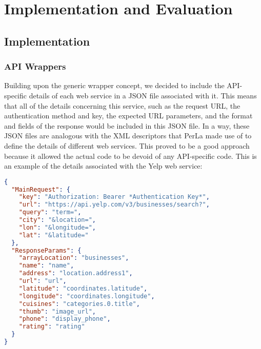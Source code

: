 \chapter{Implementation and Evaluation}
\label{capitolo7}
\thispagestyle{empty}
\section{Implementation}
\subsection{API Wrappers}
Building upon the generic wrapper concept, we decided to include the API-specific details of each web service in a JSON file associated with it. This means that all of the details concerning this service, such as the request URL, the authentication method and key, the expected URL parameters, and the format and fields of the response would be included in this JSON file. In a way, these JSON files are analogous with the XML descriptors that PerLa made use of to define the details of different web services. This proved to be a good approach because it allowed the actual code to be devoid of any API-specific code. This is an example of the details associated with the Yelp web service:
\begin{lstlisting}[language=json,firstnumber=1]
{
  "MainRequest": {
    "key": "Authorization: Bearer *Authentication Key*",
    "url": "https://api.yelp.com/v3/businesses/search?",
    "query": "term=",
    "city": "&location=",
    "lon": "&longitude=",
    "lat": "&latitude="
  },
  "ResponseParams": {
    "arrayLocation": "businesses",
    "name": "name",
    "address": "location.address1",
    "url": "url",
    "latitude": "coordinates.latitude",
    "longitude": "coordinates.longitude",
    "cuisines": "categories.0.title",
    "thumb": "image_url",
    "phone": "display_phone",
    "rating": "rating"
  }
}
\end{lstlisting}
